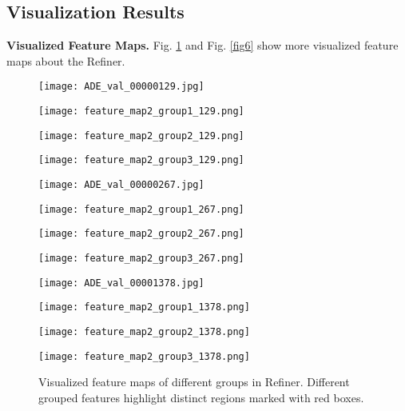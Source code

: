 \documentclass{article} \usepackage{iclr2024_conference,times}
\begin{document}
\subsection{Visualization Results}

\textbf{Visualized Feature Maps.} Fig. \ref{fig5} and Fig. \ref{fig6} show more visualized feature maps about the Refiner.

\begin{figure}
\centering
\begin{minipage}{1.3in}
\texttt{[image: ADE\_val\_00000129.jpg]}
\end{minipage}
\begin{minipage}{1.3in}
\texttt{[image: feature\_map2\_group1\_129.png]}
\end{minipage}
\begin{minipage}{1.3in}
\texttt{[image: feature\_map2\_group2\_129.png]}
\end{minipage}
\vspace{0.2em}
\begin{minipage}{1.3in}
\texttt{[image: feature\_map2\_group3\_129.png]}
\end{minipage}
\begin{minipage}{1.3in}
\texttt{[image: ADE\_val\_00000267.jpg]}
\end{minipage}
\begin{minipage}{1.3in}
\texttt{[image: feature\_map2\_group1\_267.png]}
\end{minipage}
\begin{minipage}{1.3in}
\texttt{[image: feature\_map2\_group2\_267.png]}
\end{minipage}
\vspace{0.2em}
\begin{minipage}{1.3in}
\texttt{[image: feature\_map2\_group3\_267.png]}
\end{minipage}
\begin{minipage}{1.3in}
\texttt{[image: ADE\_val\_00001378.jpg]}
\end{minipage}
\begin{minipage}{1.3in}
\texttt{[image: feature\_map2\_group1\_1378.png]}
\end{minipage}
\begin{minipage}{1.3in}
\texttt{[image: feature\_map2\_group2\_1378.png]}
\end{minipage}
\begin{minipage}{1.3in}
\texttt{[image: feature\_map2\_group3\_1378.png]}
\end{minipage}
\caption{Visualized feature maps of different groups in Refiner. Different grouped features highlight distinct regions marked with red boxes.}
\label{fig5}
\end{figure}
\end{document}
